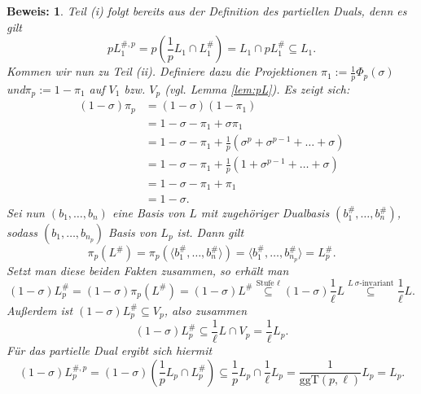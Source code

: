 \documentclass[12pt,a4paper,halfparskip,headsepline,bibtotocnumbered]{scrreprt}
\theoremstyle{nummermitklammern}
\theoremstyle{nonumberbreak}
\newtheorem{beweis}{Beweis:}
\newcommand{\ggT}{\text{ggT}}
\begin{document}
\begin{beweis}
	Teil (i) folgt bereits aus der Definition des partiellen Duals, denn es gilt
	\begin{equation*}
		p L_1^{\#,p} = p \left( \frac{1}{p}L_1 \cap L_1^\# \right) = L_1 \cap p L_1^\# \subseteq L_1.
	\end{equation*}
	Kommen wir nun zu Teil (ii). Definiere dazu die Projektionen $\pi_1 := \frac{1}{p} \Phi_p(\sigma)$ und\linebreak$\pi_p := 1-\pi_1$ auf $V_1$ bzw. $V_p$ (vgl. Lemma \eqref{lem:pL}). Es zeigt sich:
	\begin{align*}
		(1 - \sigma) \pi_p 	&= (1-\sigma) (1 - \pi_1)\\
							&= 1 - \sigma - \pi_1 + \sigma \pi_1\\
							&= 1 - \sigma - \pi_1 + \frac{1}{p} (\sigma^p + \sigma^{p-1} + \dots + \sigma)\\
							&= 1 - \sigma - \pi_1 + \frac{1}{p} (1 + \sigma^{p-1} + \dots + \sigma)\\
							&= 1 - \sigma - \pi_1 + \pi_1\\
							&= 1 - \sigma.
	\end{align*}
	Sei nun $(b_1, \dots, b_n)$ eine Basis von $L$ mit zugehöriger Dualbasis $(b_1^\#, \dots, b_n^\#)$, sodass $(b_1, \dots, b_{n_p})$ Basis von $L_p$ ist. Dann gilt
	\begin{equation*}
		\pi_p(L^\#) = \pi_p(\langle b_1^\#, \dots, b_{n}^\# \rangle) = \langle b_1^\#, \dots, b_{n_p}^\# \rangle = L_p^\#.
	\end{equation*}
	Setzt man diese beiden Fakten zusammen, so erhält man
	\begin{equation*}
		(1 - \sigma) L_p^\# = (1 - \sigma) \pi_p(L^\#) = (1 - \sigma) L^\# \stackrel{\text{Stufe } \ell}{\subseteq} (1 - \sigma) \frac{1}{\ell} L \stackrel{L \ \sigma \text{-invariant}}{\subseteq} \frac{1}{\ell} L.
	\end{equation*}
	Außerdem ist $(1 - \sigma) L_p^\# \subseteq V_p$, also zusammen
	\begin{equation*}
		(1 - \sigma) L_p^\# \subseteq \frac{1}{\ell} L \cap V_p = \frac{1}{\ell} L_p.
	\end{equation*}
	Für das partielle Dual ergibt sich hiermit
	\begin{equation*}
		(1-\sigma) L_p^{\#,p} = (1 - \sigma) \left(\frac{1}{p}L_p \cap L_p^\# \right) \subseteq \frac{1}{p} L_p \cap \frac{1}{\ell} L_p  = \frac{1}{\ggT(p, \ell)} L_p = L_p.
	\end{equation*}
\end{beweis}
\end{document}
